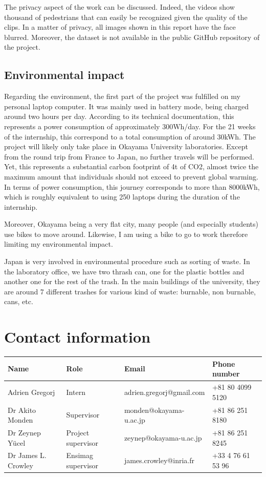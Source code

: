 \documentclass[12pt,a4paper,twoside]{article}
\begin{document}
The privacy aspect of the work can be discussed. Indeed, the videos show thousand of pedestrians that can easily be recognized given the quality of the clips. In a matter of privacy, all images shown in this report have the face blurred. Moreover, the dataset is not available in the public GitHub repository of the project.


\subsection{Environmental impact}
Regarding the environment, the first part of the project was fulfilled on my personal laptop computer. It was mainly used in battery mode, being charged around two hours per day. According to its technical documentation, this represents a power consumption of approximately 300Wh/day. For the 21 weeks of the internship, this correspond to a total consumption of around 30kWh.
The project will likely only take place in Okayama University laboratories. Except from the round trip from France to Japan, no further travels will be performed. Yet, this represents a substantial carbon footprint of 4t of CO2, almost twice the maximum amount that individuals should not exceed to prevent global warming. In terms of power consumption, this journey corresponds to more than 8000kWh, which is roughly equivalent to using 250 laptops during the duration of the internship. 

Moreover, Okayama being a very flat city, many people (and especially students) use bikes to move around. Likewise, I am using a bike to go to work therefore limiting my environmental impact. 

Japan is very involved in environmental procedure such as sorting of waste. In the laboratory office, we have two thrash can, one for the plastic bottles and another one for the rest of the trash. In the main buildings of the university, they are around 7 different trashes for various kind of waste: burnable, non burnable, cans, etc. 

{}


\newpage

\appendix
\section{Contact information}


\begin{tabular}{@{}llll@{}} \toprule
    Name & Role & Email & Phone number \\ \midrule
    Adrien Gregorj & Intern & adrien.gregorj@gmail.com & +81 80 4099 5120 \\
    Dr Akito Monden & Supervisor &  monden@okayama-u.ac.jp & +81 86 251 8180 \\
    Dr Zeynep Yücel & Project supervisor & zeynep@okayama-u.ac.jp & +81 86 251 8245 \\
    Dr James L. Crowley & Ensimag supervisor & james.crowley@inria.fr & +33 4 76 61 53 96 \\ \bottomrule
\end{tabular}
\end{document}
